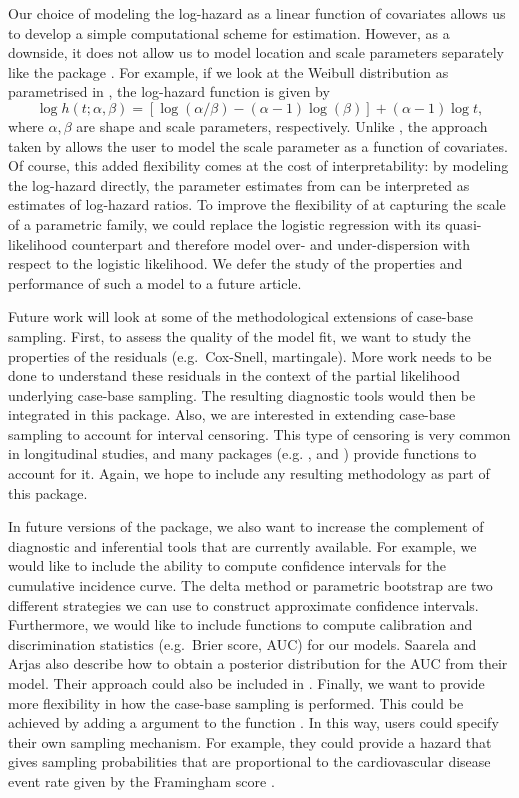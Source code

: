 \documentclass[
]{jss}
\begin{document}
Our choice of modeling the log-hazard as a linear function of covariates
allows us to develop a simple computational scheme for estimation.
However, as a downside, it does not allow us to model location and scale
parameters separately like the package . For example, if
we look at the Weibull distribution as parametrised in
, the log-hazard function is given by
\[ \log h(t; \alpha, \beta) = \left[\log(\alpha/\beta) - (\alpha - 1)\log(\beta)\right] + (\alpha - 1)\log t,\]
where \(\alpha,\beta\) are shape and scale parameters, respectively.
Unlike , the approach taken by  allows the
user to model the scale parameter as a function of covariates. Of
course, this added flexibility comes at the cost of interpretability: by
modeling the log-hazard directly, the parameter estimates from
 can be interpreted as estimates of log-hazard ratios. To
improve the flexibility of  at capturing the scale of a
parametric family, we could replace the logistic regression with its
quasi-likelihood counterpart and therefore model over- and
under-dispersion with respect to the logistic likelihood. We defer the
study of the properties and performance of such a model to a future
article.

Future work will look at some of the methodological extensions of
case-base sampling. First, to assess the quality of the model fit, we
want to study the properties of the residuals (e.g.~Cox-Snell,
martingale). More work needs to be done to understand these residuals in
the context of the partial likelihood underlying case-base sampling. The
resulting diagnostic tools would then be integrated in this package.
Also, we are interested in extending case-base sampling to account for
interval censoring. This type of censoring is very common in
longitudinal studies, and many packages (e.g. ,
 and ) provide functions to account for it.
Again, we hope to include any resulting methodology as part of this
package.

In future versions of the package, we also want to increase the
complement of diagnostic and inferential tools that are currently
available. For example, we would like to include the ability to compute
confidence intervals for the cumulative incidence curve. The delta
method or parametric bootstrap are two different strategies we can use
to construct approximate confidence intervals. Furthermore, we would
like to include functions to compute calibration and discrimination
statistics (e.g.~Brier score, AUC) for our models. Saarela and Arjas
\citeyearpar{saarela2015non} also describe how to obtain a posterior
distribution for the AUC from their model. Their approach could also be
included in . Finally, we want to provide more flexibility
in how the case-base sampling is performed. This could be achieved by
adding a  argument to the function .
In this way, users could specify their own sampling mechanism. For
example, they could provide a hazard that gives sampling probabilities
that are proportional to the cardiovascular disease event rate given by
the Framingham score \citep{saarela2015non}.
\end{document}
